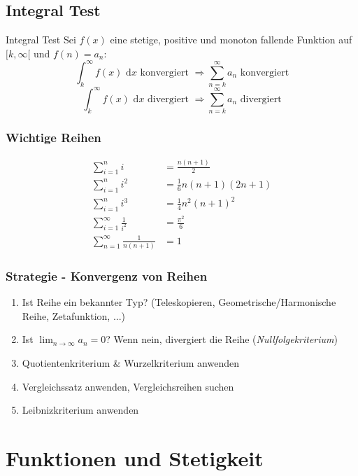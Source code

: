 \documentclass[a4paper,8pt]{extarticle}
\def\limn{\lim_{n\to \infty}}
\def\dx{\text{ d}x}
\begin{document}
\subsection{Integral Test}
\begin{mainbox}{Integral Test}
  Sei $f(x)$ eine stetige, positive und monoton fallende Funktion auf $[k, \infty[$ und $f(n) = a_n$:
  $$\int_k^\infty f(x)\dx \text{ konvergiert } \Rightarrow \sum_{n = k}^\infty a_n \text{ konvergiert}$$$$\int_k^\infty f(x)\dx \text{ divergiert } \Rightarrow \sum_{n = k}^\infty a_n \text{ divergiert}$$
\end{mainbox}

\subsubsection{Wichtige Reihen}
\begin{align*}
 \sum_{i=1}^n i &= \frac{n(n+1)}{2} \\
 \sum_{i=1}^n i^2 &= \frac{1}{6}n(n+1)(2n+1) \\
 \sum_{i=1}^n i^3 &= \frac{1}{4}n^2(n+1)^2 \\
 \sum_{i=1}^\infty \frac{1}{i^2} &= \frac{\pi^2}{6} \\
 \sum_{n=1}^\infty \frac{1}{n(n+1)} &= 1
\end{align*}

\subsubsection{Strategie - Konvergenz von Reihen}
\begin{enumerate}
 \item Ist Reihe ein bekannter Typ? (Teleskopieren, Geometrische/Harmonische Reihe, Zetafunktion, ...)
 \item Ist $\limn a_n = 0$? Wenn nein, divergiert die Reihe (\textit{Nullfolgekriterium})
 \item Quotientenkriterium \& Wurzelkriterium anwenden
 \item Vergleichssatz anwenden, Vergleichsreihen suchen
 \item Leibnizkriterium anwenden
\end{enumerate}

\section{Funktionen und Stetigkeit}
\end{document}
